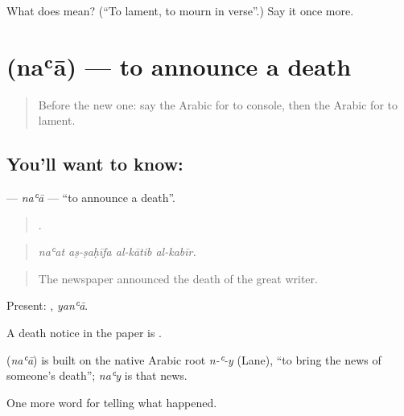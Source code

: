 \begin{tcolorbox}[breakable,colback=teal!4,colframe=teal!35!black,title={Before you move on}]
What does  mean? (\textquotedblleft{}To lament, to mourn in verse\textquotedblright{}.) Say it once more.
\end{tcolorbox}
\section[\texorpdfstring{\ar{نعى} (naʿā)}{نعى (naʿā)}]{ (naʿā) — to announce a death}

\label{lesson:AR-C319-naa}



\begin{quote}
Before the new one: say the Arabic for to console, then the Arabic for to lament.
\end{quote}

\subsection*{You'll want to know: }
\textbf{} — \emph{naʿā} — \textquotedblleft{}to announce a death\textquotedblright{}.

\begin{quote}
   .
\end{quote}

\begin{quote}
\emph{naʿat aṣ-ṣaḥīfa al-kātib al-kabīr.}
\end{quote}

\begin{quote}
The newspaper announced the death of the great writer.
\end{quote}

Present: , \emph{yanʿā}.

A death notice in the paper is .

\begin{cousinweb}
\textbf{} (\emph{naʿā}) is built on the native Arabic root \emph{n-ʿ-y} (Lane), \textquotedblleft{}to bring the news of someone's death\textquotedblright{}; \emph{naʿy} is that news.
\end{cousinweb}

\begin{grammarlens}[title={What you've built}]
One more word for telling what happened.
\end{grammarlens}

